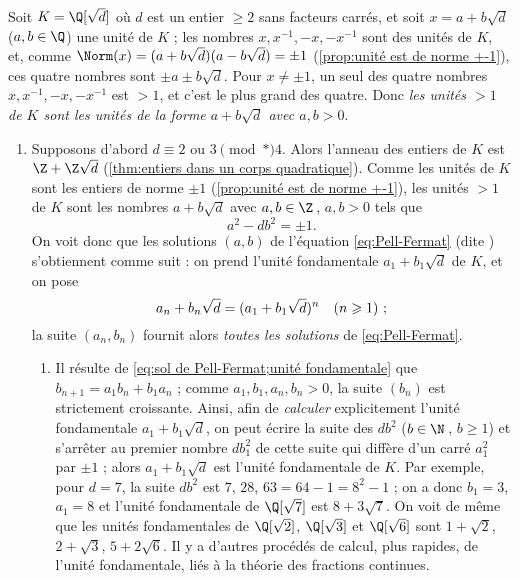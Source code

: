 \documentclass[11pt, useosf,
  title in boldface,
  theorem in new line,
  theorem numbering = section,
  number theorems separately,
]{simplivre}
\begin{document}
\enlargethispage*{\baselineskip}
    Soit \( K = \Q[\sqrt{d}] \) où \( d \) est un entier \( \geqslant 2 \) sans facteurs carrés, et soit \( x = a + b \sqrt{d} \) (\( a,b \in \Q \)) une unité de \( K \) ; les nombres \( x, x^{-1}, -x, -x^{-1} \) sont des unités de \( K \), et, comme \( \Norm(x) = (a+b\sqrt{d})(a-b\sqrt{d}) = \pm 1 \) (\cref{prop:unité est de norme +-1}), ces quatre nombres sont \( \pm a \pm b\sqrt{d} \). Pour \( x \neq \pm 1 \), un seul des quatre nombres \( x, x^{-1}, -x, -x^{-1} \) est \( > 1 \), et c'est le plus grand des quatre. Donc \emph{les unités \( > 1 \) de \( K \) sont les unités de la forme \( a+b\sqrt{d} \) avec \( a, b > 0 \)}.
    \begin{enumerate}
        \item \label{unités des corps quadratiques réels;cas1} Supposons d'abord \( d \equiv 2 \) ou \( 3 \pmod*{4} \). Alors l'anneau des entiers de \( K \) est \( \Z + \Z\sqrt{d} \) (\cref{thm:entiers dans un corps quadratique}). Comme les unités de \( K \) sont les entiers de norme \( \pm 1 \) (\cref{prop:unité est de norme +-1}), les unités \( > 1 \) de \( K \) sont les nombres \( a+b\sqrt{d} \) avec \( a,b \in \Z \)\,, \( a, b > 0 \) tels que
        \begin{equation}\label{eq:Pell-Fermat}
            a^2 - db^2 = \pm 1.
        \end{equation}
        On voit donc que les solutions  \( (a,b) \) de l'équation \eqref{eq:Pell-Fermat} (dite ) s'obtiennent comme suit : on prend l'unité fondamentale \( a_1 + b_1 \sqrt{d} \) de \( K \), et on pose
        \begin{equation}\label{eq:sol de Pell-Fermat;unité fondamentale}
            a_n + b_n \sqrt{d} = (a_1 + b_1 \sqrt{d})^n \quad \text{(\( n \geqslant 1 \)) ;}
        \end{equation}
        la suite \( (a_n, b_n) \) fournit alors \emph{toutes les solutions} de \eqref{eq:Pell-Fermat}.
        \begin{remark}
            \begin{enumerate}
                \item Il résulte de \eqref{eq:sol de Pell-Fermat;unité fondamentale} que \( b_{n+1} = a_1 b_n + b_1 a_n \) ; comme \( a_1, b_1, a_n, b_n > 0 \), la suite \( (b_n) \) est strictement croissante. Ainsi, afin de \emph{calculer} explicitement l'unité fondamentale \( a_1 + b_1 \sqrt{d} \), on peut écrire la suite des \( d b^2 \) (\( b \in \N \)\,, \( b \geqslant 1 \)) et s'arrêter au premier nombre \( d b_1^2 \) de cette suite qui diffère d'un carré \( a_1^2 \) par \( \pm 1 \) ; alors \( a_1 + b_1 \sqrt{d} \) est l'unité fondamentale de \( K \). Par exemple, pour \( d = 7 \), la suite \( d b^2 \) est \( 7 \), \( 28 \), \( 63 = 64 - 1 = 8^2 - 1 \) ; on a donc \( b_1 = 3 \), \( a_1 = 8 \) et l'unité fondamentale de \( \Q[\sqrt{7}] \) est \( 8 + 3\sqrt{7} \). On voit de même que les unités fondamentales de \( \Q[\sqrt{2}] \), \( \Q[\sqrt{3}] \) et \( \Q[\sqrt{6}] \) sont \( 1+\sqrt{2} \), \( 2+\sqrt{3} \), \( 5+2\sqrt{6} \). Il y a d'autres procédés de calcul, plus rapides, de l'unité fondamentale, liés à la théorie des fractions continues.

\end{enumerate}
\end{remark}
\end{enumerate}
\end{document}
